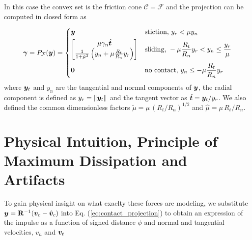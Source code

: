 In this case the convex set is the friction cone $\mathcal{C} = \mathcal{F}$ and
the projection can be computed in closed form as

\begin{equation}
	\bgamma = P_\mathcal{F}(\vf{y}) = 
\begin{dcases}
	\vf{y} 
	& \text{stiction, } y_r < \mu y_n\\
	\begin{bmatrix}
		\mu\gamma_n\hat{\vf{t}}\\
		\frac{1}{1+\tilde\mu^2}\left(y_n +
	\mu\frac{R_t}{R_n}y_r\right)
	\end{bmatrix}
	& \text{sliding, } -\mu \frac{R_t}{R_n} y_r < y_n \leq \frac{y_r}{\mu}\\
    \vf{0} & \text{no contact, } y_n \leq -\mu \frac{R_t}{R_n} y_r
\end{dcases}	  
	\label{eq:contact_projection}
\end{equation}
where ${\bm{y}}_t$ and $y_n$ are the tangential and normal components of ${\bm{y}}$,
the radial component is defined as $y_r=\Vert{\bm{y}}_t\Vert$ and the tangent
vector as $\hat{{\bm{t}}}={\bm{y}}_t/y_r$. We also defined the common dimensionless
factors $\tilde\mu=\mu\,(R_t/R_n)^{1/2}$ and $\hat\mu=\mu\,R_t/R_n$.


\section{Physical Intuition, Principle of Maximum Dissipation and Artifacts}
\label{sec:physical_intuition}


To gain physical insight on what exaclty these forces are modeling, we
substitute ${\bm{y}}={\mathbf{R}}^{-1}({\bm{v}}_c - \hat{{\bm{v}}}_c)$ into Eq.
(\ref{eq:contact_projection}) to obtain an expression of the impulse as a
function of signed distance $\phi$ and normal and tangential velocities, $v_n$
and ${\bm{v}}_t$


